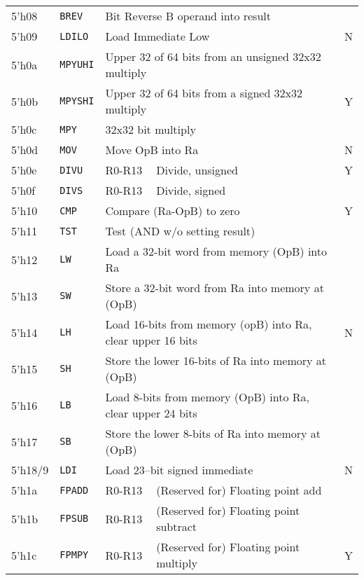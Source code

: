 \documentclass{gqtekspec}
\begin{document}
\begin{table}
\begin{center}
\begin{tabular}{|l|l|l|l|c|}
5'h08 & {\tt BREV} & \multicolumn{2}{l|}{Bit Reverse B operand into result}&  \\\cline{1-4}
5'h09 & {\tt LDILO} & \multicolumn{2}{l|}{Load Immediate Low} & N\\\hline
5'h0a & {\tt MPYUHI} & \multicolumn{2}{l|}{Upper 32 of 64 bits from an unsigned 32x32 multiply} &  \\\cline{1-4}
5'h0b & {\tt MPYSHI} & \multicolumn{2}{l|}{Upper 32 of 64 bits from a signed 32x32 multiply} & Y \\\cline{1-4}
5'h0c & {\tt MPY} & \multicolumn{2}{l|}{32x32 bit multiply} & \\\hline
5'h0d & {\tt MOV} & \multicolumn{2}{l|}{Move OpB into Ra} & N \\\hline
5'h0e & {\tt DIVU} & R0-R13 & Divide, unsigned & Y \\\cline{1-4}
5'h0f & {\tt DIVS} & R0-R13 & Divide, signed &  \\\hline\hline
%
5'h10 & {\tt CMP} & \multicolumn{2}{l|}{Compare (Ra-OpB) to zero} & Y \\\cline{1-4}
5'h11 & {\tt TST} & \multicolumn{2}{l|}{Test (AND w/o setting result)} &   \\\hline
5'h12 & {\tt LW} & \multicolumn{2}{l|}{Load a 32-bit word from memory (OpB) into Ra} & \\\cline{1-4}
5'h13 & {\tt SW} & \multicolumn{2}{l|}{Store a 32-bit word from Ra into memory at (OpB)} &  \\\cline{1-4}
5'h14 & {\tt LH} & \multicolumn{2}{l|}{Load 16-bits from memory (opB) into Ra, clear upper 16 bits} & N \\\cline{1-4}
5'h15 & {\tt SH} & \multicolumn{2}{l|}{Store the lower 16-bits of Ra into memory at (OpB)} &  \\\cline{1-4}
5'h16 & {\tt LB} & \multicolumn{2}{l|}{Load 8-bits from memory (OpB) into Ra, clear upper 24 bits} & \\\cline{1-4}
5'h17 & {\tt SB} & \multicolumn{2}{l|}{Store the lower 8-bits of Ra into memory at (OpB)} &  \\\hline\hline
5'h18/9 & {\tt LDI} & \multicolumn{2}{l|}{Load 23--bit signed immediate} & N \\\hline\hline
5'h1a & {\tt FPADD} & R0-R13 & (Reserved for) Floating point add &  \\\cline{1-4}
5'h1b & {\tt FPSUB} & R0-R13 & (Reserved for) Floating point subtract &   \\\cline{1-4}
5'h1c & {\tt FPMPY} & R0-R13 & (Reserved for) Floating point multiply & Y \\\cline{1-4}

\end{tabular}
\end{center}
\end{table}
\end{document}
